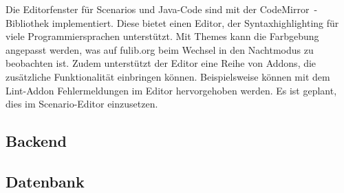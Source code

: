 Die Editorfenster für Scenarios und Java-Code sind mit der CodeMirror~\cite{codemirror}-Bibliothek implementiert.
Diese bietet einen Editor, der Syntaxhighlighting für viele Programmiersprachen unterstützt.
Mit Themes kann die Farbgebung angepasst werden, was auf fulib.org beim Wechsel in den Nachtmodus zu beobachten ist.
Zudem unterstützt der Editor eine Reihe von Addons, die zusätzliche Funktionalität einbringen können.
Beispielsweise können mit dem Lint-Addon Fehlermeldungen im Editor hervorgehoben werden.
Es ist geplant, dies im Scenario-Editor einzusetzen.

\subsection{Backend}\label{subsec:backend}


\subsection{Datenbank}\label{subsec:database}

